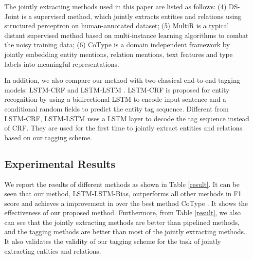 \documentclass[11pt,a4paper]{article}
\begin{document}
The jointly extracting methods used in this paper are listed as follows:
(4) DS-Joint \cite{li2014} is a supervised method, which jointly extracts entities and relations using structured perceptron on human-annotated dataset;
(5) MultiR \cite{mutilr} is a typical distant supervised method based on multi-instance learning algorithms to combat the noisy training data;
(6) CoType \cite{ren2016cotype} is a domain independent framework by jointly embedding entity mentions, relation mentions, text features and type labels into meaningful representations.

In addition, we also compare our method with two classical end-to-end tagging models:
LSTM-CRF \cite{lstm-crf} and LSTM-LSTM \cite{supertagging}.
LSTM-CRF is proposed for entity recognition by using a bidirectional LSTM
to encode input sentence and a conditional random fields to predict the entity tag sequence.
Different from LSTM-CRF, LSTM-LSTM uses a LSTM layer to decode the tag sequence instead of CRF.
They are used for the first time to jointly extract entities and relations based on our tagging scheme.

\subsection{Experimental Results}
We report the results of different methods as shown in Table \ref{result}.
It can be seen that our method, LSTM-LSTM-Bias, outperforms all other methods in F1 score
and achieves a  improvement in  over the best method CoType \cite{ren2016cotype}.
It shows the  effectiveness of our proposed method.
Furthermore, from Table \ref{result}, we also can see that the jointly extracting methods are better than pipelined methods,
and the tagging methods are better than most of the jointly extracting methods.
It  also validates the validity of our tagging scheme for the task of jointly extracting entities and relations.
\end{document}
